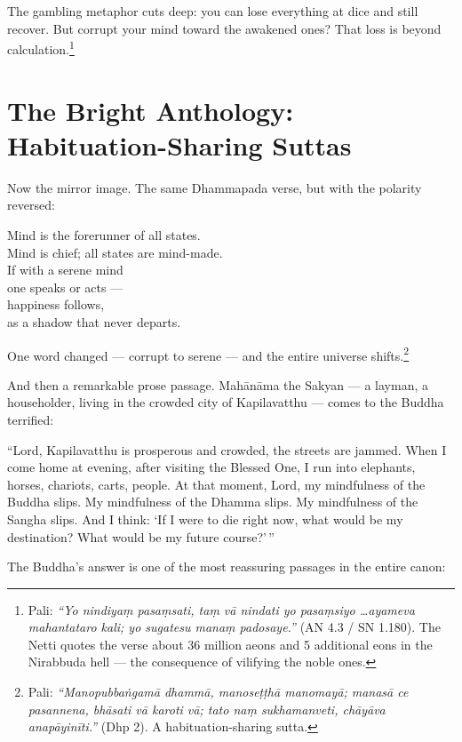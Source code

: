 \noindent The gambling metaphor cuts deep: you can lose everything at dice and still recover. But corrupt your mind toward the awakened ones? That loss is beyond calculation.\footnote{Pali: \textit{``Yo nindiyaṃ pasaṃsati, taṃ vā nindati yo pasaṃsiyo \ldots ayameva mahantataro kali; yo sugatesu manaṃ padosaye.''} (AN 4.3 / SN 1.180). The Netti quotes the verse about 36 million aeons and 5 additional eons in the Nirabbuda hell --- the consequence of vilifying the noble ones.}

\section*{The Bright Anthology: Habituation-Sharing Suttas}

Now the mirror image. The same Dhammapada verse, but with the polarity reversed:

\begin{versebox}
Mind is the forerunner of all states.\\
Mind is chief; all states are mind-made.\\
If with a serene mind\\
one speaks or acts ---\\
happiness follows,\\
as a shadow that never departs.
\end{versebox}

\noindent One word changed --- corrupt to serene --- and the entire universe shifts.\footnote{Pali: \textit{``Manopubbaṅgamā dhammā, manoseṭṭhā manomayā; manasā ce pasannena, bhāsati vā karoti vā; tato naṃ sukhamanveti, chāyāva anapāyinīti.''} (Dhp 2). A habituation-sharing sutta.}

And then a remarkable prose passage. Mahānāma the Sakyan --- a layman, a householder, living in the crowded city of Kapilavatthu --- comes to the Buddha terrified:

``Lord, Kapilavatthu is prosperous and crowded, the streets are jammed. When I come home at evening, after visiting the Blessed One, I run into elephants, horses, chariots, carts, people. At that moment, Lord, my mindfulness of the Buddha slips. My mindfulness of the Dhamma slips. My mindfulness of the Sangha slips. And I think: `If I were to die right now, what would be my destination? What would be my future course?'\,''

The Buddha's answer is one of the most reassuring passages in the entire canon:

